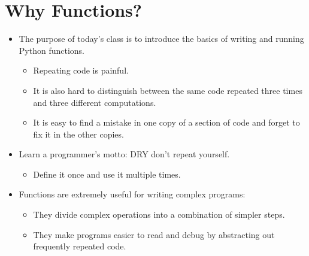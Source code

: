 \documentclass[letterpaper,10pt,english]{sphinxmanual}
\begin{document}
\section{Why Functions?}
\label{\detokenize{lecture_notes/lec05_functions2:why-functions}}\begin{itemize}
\item {} 
The purpose of today’s class is to introduce the basics of writing
and running Python functions.
\begin{itemize}
\item {} 
Repeating code is painful.

\item {} 
It is also hard to distinguish between the same code
repeated three times and three different computations.

\item {} 
It is easy to find a mistake in one copy of a section of code
and forget to fix it in the other copies.

\end{itemize}

\item {} 
Learn a programmer’s motto: DRY \textendash{} don’t repeat yourself.
\begin{itemize}
\item {} 
Define it once and use it multiple times.

\end{itemize}

\item {} 
Functions are extremely useful for writing complex programs:
\begin{itemize}
\item {} 
They divide complex operations into a combination of simpler steps.

\item {} 
They make programs easier to read and debug by abstracting out frequently
repeated code.

\end{itemize}

\end{itemize}
\end{document}
